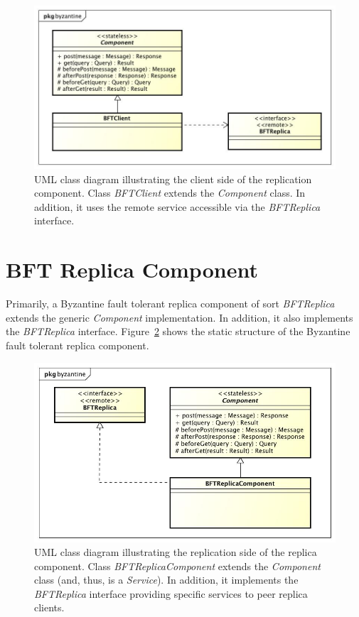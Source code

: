 \documentclass[oneside]{scrreprt}
\newcommand{\fig}[1]{Figure~\ref{#1}}
\begin{document}
\begin{figure}[ht]
\centerline{
\includegraphics[width=1.0\textwidth]{figs/byzantine-client}}
\caption{UML class diagram illustrating the client side
of the replication component. Class \emph{BFTClient} extends the
\emph{Component} class. In addition, it uses the remote service
accessible via the \emph{BFTReplica} interface.}
\label{fig:byzantine-client}
\end{figure}


\section{BFT Replica Component}

Primarily, a Byzantine fault tolerant replica
component of sort \emph{BFTReplica} extends the
generic \emph{Component} implementation. In addition,
it also implements the \emph{BFTReplica} interface.
\fig{fig:byzantine-replica} shows
the static structure of the Byzantine fault tolerant replica
component.


\begin{figure}[ht<]
\centerline{
\includegraphics[width=1.0\textwidth]{figs/byzantine-replica}}
\caption{UML class diagram illustrating the replication side
of the replica component. Class \emph{BFTReplicaComponent}
extends the \emph{Component} class (and, thus, is a \emph{Service}). In
addition, it implements the \emph{BFTReplica} interface providing
specific services to peer replica clients.}
\label{fig:byzantine-replica}
\end{figure}
\end{document}
